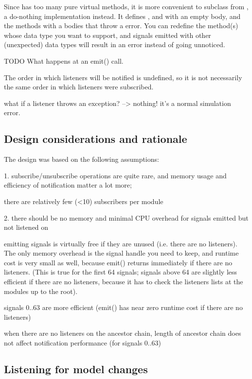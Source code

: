\begin{note}
\begin{note}
Since  has too many pure virtual methods, it is more
convenient to subclass from , a do-nothing implementation
instead. It defines ,  and
 with an empty body, and the 
methods with a bodies that throw a  error.
You can redefine the  method(s) whose data type
you want to support, and signals emitted with other (unexpected) data
types will result in an error instead of going unnoticed.

TODO What happens at an emit() call.

The order in which listeners will be notified is undefined, so
it is not necessarily the same order in which listeners were subscribed.

what if a listener throws an exception? --> nothing! it's a normal simulation error.



\subsection{Design considerations and rationale}

The design was based on the following assumptions:

1. subscribe/unsubscribe operations are quite rare,
and memory usage and efficiency of notification matter a lot more;

there are relatively few (<10) subscribers per module

2. there should be no memory and minimal CPU overhead for signals emitted but not listened on

emitting signals is virtually free if they are unused (i.e. there are
no listeners). The only memory overhead is the signal handle you need
to keep, and runtime cost is very small as well, because emit()
returns immediately if there are no listeners. (This is true for the
first 64 signals; signals above 64 are slightly less efficient if there
are no listeners, because it has to check the listeners lists at
the modules up to the root).

signals 0..63 are more efficient (emit() has near zero runtime cost if there
are no listeners)

when there are no listeners on the ancestor chain, length of ancestor chain
does not affect notification performance (for signals 0..63)



\subsection{Listening for model changes}


\end{note}
\end{note}
